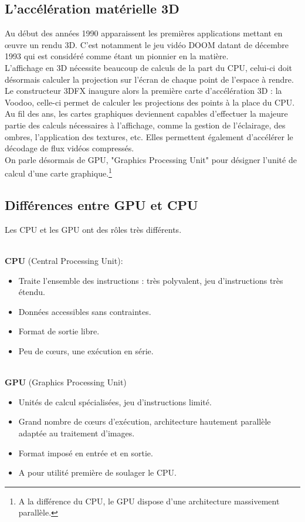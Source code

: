 \subsection{L'accélération matérielle 3D}
Au début des années 1990 apparaissent les premières applications mettant en œuvre un rendu 3D. C'est notamment le jeu vidéo DOOM datant de décembre 1993 qui est considéré comme étant un pionnier en la matière.\\
L'affichage en 3D nécessite beaucoup de calculs de la part du CPU, celui-ci doit désormais calculer la projection sur l'écran de chaque point de l'espace à rendre.\\
Le constructeur 3DFX inaugure alors la première carte d'accélération 3D : la Voodoo, celle-ci permet de calculer les projections des points à la place du CPU.\\
Au fil des ans, les cartes graphiques deviennent capables d'effectuer la majeure partie des calculs nécessaires à l'affichage,  comme la gestion de l'éclairage, des ombres, l'application des textures, etc. Elles permettent
également d'accélérer le décodage de flux vidéos compressés.\\
On parle désormais de GPU, "Graphics Processing Unit" pour désigner l'unité de calcul d'une carte graphique.\footnote{A la différence du CPU, le GPU dispose d'une architecture massivement parallèle.}

\subsection{Différences entre GPU et CPU}

Les CPU et les GPU ont des rôles très différents.

\textbf{\\CPU} (Central Processing Unit):
\begin{itemize}
	\item	Traite l'ensemble des instructions : très polyvalent, jeu d'instructions très étendu.
	\item	Données accessibles sans contraintes.
	\item	Format de sortie libre.
	\item	Peu de cœurs, une exécution en série.
\end{itemize}

\textbf{\\GPU} (Graphics Processing Unit)
\begin{itemize}
	\item	Unités de calcul spécialisées, jeu d'instructions limité.
	\item	Grand nombre de cœurs d'exécution, architecture hautement parallèle adaptée au traitement d'images.
	\item	Format imposé en entrée et en sortie.
	\item	A pour utilité première de soulager le CPU.

\end{itemize}

